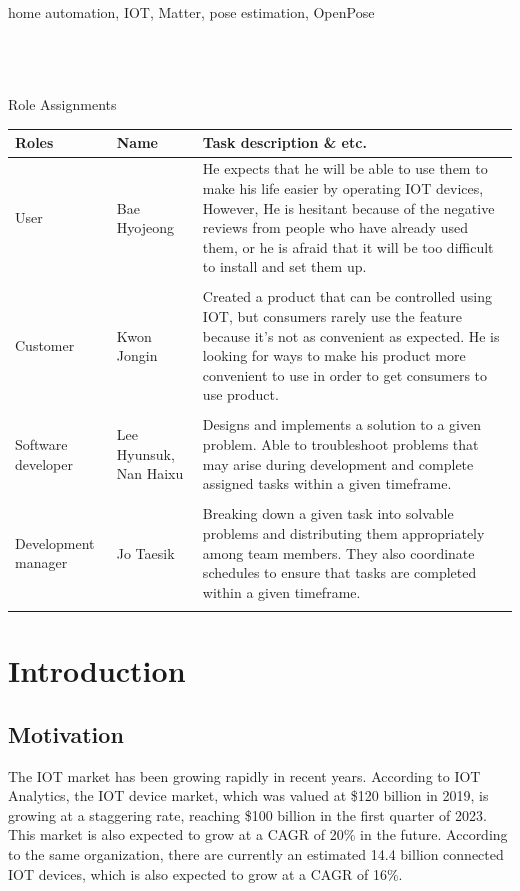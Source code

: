 \documentclass[11pt, conference]{IEEEtran}
\begin{document}
\begin{IEEEkeywords}
home automation, IOT, Matter, pose estimation, OpenPose \\\\\\\\
\end{IEEEkeywords}

\large{Role Assignments}
\begin{table}[H]
\center
\begin{tabular}{m{1.4cm} m{1.5cm} m{4cm}}
\toprule
Roles & Name & Task description \& etc.\\
\midrule
User & Bae Hyojeong & He expects that he will be able to use them to make his life easier by operating IOT devices, However, He is hesitant because of the negative reviews from people who have already used them, or he is afraid that it will be too difficult to install and set them up. \\\\
Customer & Kwon Jongin & Created a product that can be controlled using IOT, but consumers rarely use the feature because it's not as convenient as expected. He is looking for ways to make his product more convenient to use in order to get consumers to use product. \\\\
Software developer & Lee Hyunsuk, Nan Haixu & Designs and implements a solution to a given problem. Able to troubleshoot problems that may arise during development and complete assigned tasks within a given timeframe. \\\\
Development manager & Jo Taesik & Breaking down a given task into solvable problems and distributing them appropriately among team members. They also coordinate schedules to ensure that tasks are completed within a given timeframe. \\\\
\bottomrule
\end{tabular}
\end{table}
\newpage

\section{\Large{Introduction}}
\subsection {\large{Motivation}} 
The IOT market has been growing rapidly in recent years. According to IOT Analytics, the IOT device market, which was valued at \$120 billion in 2019, is growing at a staggering rate, reaching \$100 billion in the first quarter of 2023. This market is also expected to grow at a CAGR of 20\% in the future. According to the same organization, there are currently an estimated 14.4 billion connected IOT devices, which is also expected to grow at a CAGR of 16\%. \\\\
\end{document}

